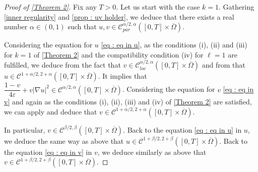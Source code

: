 \documentclass[reqno,12pt,twoside]{amsart}
\numberwithin{equation}{section} \numberwithin{theorem}{section}
\numberwithin{proposition}{section} \numberwithin{lemma}{section}
\numberwithin{corollary}{section}
\numberwithin{definition}{section} \numberwithin{remark}{section}
\begin{document}
\begin{proof}[Proof of \autoref{Theorem 2}]
Fix any $T >0$. Let us start with the case $k=1$. 
Gathering \autoref{inner regularity} and \autoref{prop : uv holder}, we deduce that there exists a real number $\alpha \in (0,1)$ such that $u,v \in \mathcal{C}_{par}^{\alpha/2, \alpha}([0,T] \times \overline{\Omega})$. 

\smallskip

Considering the equation for $u$ \eqref{eq : eq in u}, as the conditions (i), (ii) and (iii) for $k=1$ of \autoref{Theorem 2} and the compatibility condition (iv) for $\ell =1$ are fulfilled, we deduce from the fact that $v\in \mathcal{C}_{loc}^{\alpha/2, \alpha}([0,T]\times \overline{\Omega})$ and from \cite[Section IV, Theorem 5.2]{LSU68} that $u\in \mathcal{C}^{1+\alpha/2, 2+\alpha}([0,T]\times \overline{\Omega})$. 
It implies that $\dfrac{1-v}{4\varepsilon} + v|\nabla u|^2\in \mathcal{C}^{\alpha/2, \alpha}([0,T]\times \overline{\Omega})$. 
Considering the equation for $v$ \eqref{eq : eq in v} and again as the conditions (i), (ii), (iii) and (iv) of \autoref{Theorem 2} are satisfied, we can apply \cite[Section IV, Theorem 5.2]{LSU68} and deduce that $v\in \mathcal{C}^{1+\alpha/2, 2+\alpha}([0,T]\times \overline{\Omega})$. 

\smallskip

In particular, $v\in \mathcal{C}^{\beta/2, \beta}([0,T]\times \overline{\Omega})$. Back to the equation \eqref{eq : eq in u} in $u$, we deduce the same way as above that $u\in \mathcal{C}^{1+\beta/2, 2+\beta}([0,T] \times \overline{\Omega})$. Back to the equation \eqref{eq : eq in v} in $v$, we deduce similarly as above that $v\in \mathcal{C}^{1+\beta/2, 2+\beta}([0,T]\times \overline{\Omega})$. 

\medskip


\end{proof}
\end{document}
